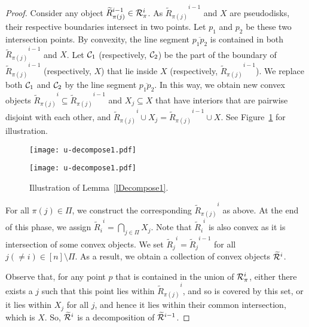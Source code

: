 \documentclass[a4paper,11pt]{article}
\begin{document}
\begin{proof}
Consider any  object ${{\widetilde{R}}_{\pi(j)}}^{i-1}\in {\cal R}_{\pi}^i$. 
As ${{\widetilde{R}}_{\pi(j)}}^{i-1}$  and $X$ are pseudodisks, 
their respective boundaries intersect in two points.
 Let 
$p_1$ and $p_2$ be these  two intersection points. 
By convexity, the line segment $\overline{p_1p_2}$  is contained in both
 ${{\widetilde{R}}_{\pi(j)}}^{i-1}$  and $X$.
Let ${\cal C}_1$ (respectively, 
${\cal C}_2$) 
be the part of the boundary of ${{\widetilde{R}}_{\pi(j)}}^{i-1}$ (respectively, 
$X$) 
that lie
inside $X$ (respectively, ${{\widetilde{R}}_{\pi(j)}}^{i-1}$).
 We replace  both ${\cal C}_1$ and 
${\cal C}_2$ by the line segment $\overline{p_1p_2}$. In this way, we obtain new  convex objects 
${{\widetilde{R}}_{\pi(j)}}^{i}\subseteq {{\widetilde{R}}_{\pi(j)}}^{i-1}$ and $X_j\subseteq X$  that have interiors that are  pairwise disjoint  with each other, and 
${{\widetilde{R}}_{\pi(j)}}^{i}\cup X_j={{\widetilde{R}}_{\pi(j)}}^{i-1}\cup X$.  See 
Figure~\ref{figDecompose2} for illustration. 

\begin{figure}[!htb]
    \centering
    \begin{minipage}{.5\textwidth}
        \centering
        \texttt{[image: u-decompose1.pdf]}


    \end{minipage}\begin{minipage}{0.5\textwidth}
        \centering
        \texttt{[image: u-decompose1.pdf]}
\end{minipage}
     \caption{{Illustration of Lemma~\ref{lDecompose1}}.}
      \label{figDecompose2}
\end{figure}



For all $\pi(j)\in \Pi$, we 
construct the corresponding ${{\widetilde{R}}_{\pi(j)}}^{i}$ as above. 
At the end of this phase, we assign ${{\widetilde{R}}_i}^{i}=\bigcap_{j\in \Pi} X_j$. Note  that ${{\widetilde{R}}_i}^{i}$ is also convex as it is intersection of some convex objects.
We  set  ${{\widetilde{R}}_j}^{i}={{\widetilde{R}}_j}^{i-1}$ for 
all $j(\neq i)\in [n] \setminus \Pi$.  As a result, we obtain a collection of convex objects  $\widetilde{\cal R}^{i}$.

Observe that, for any point $p$ that is contained in the union of ${\cal 
R}_{\pi}^i$, either there exists a $j$ such that this point lies within ${{\widetilde{R}}_{\pi(j)}}^{i}$, and so is covered by this set, or it lies within $X_j$ for all $j$, and hence it lies within their common intersection, which is $X$. So, $\widetilde{\cal R}^i$  is a decomposition of $\widetilde{\cal R}^{i-1}$.


\end{proof}
\end{document}
